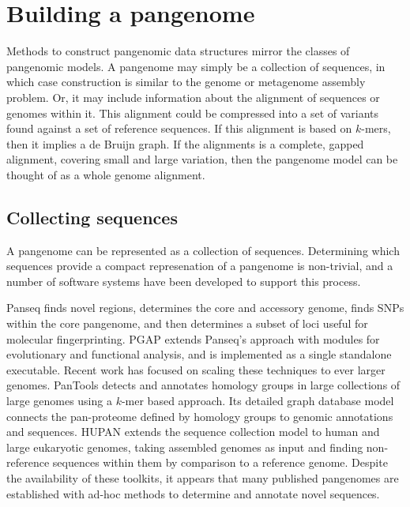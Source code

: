 \section{Building a pangenome}

Methods to construct pangenomic data structures mirror the classes of pangenomic models.
A pangenome may simply be a collection of sequences, in which case construction is similar to the genome or metagenome assembly problem.
Or, it may include information about the alignment of sequences or genomes within it.
This alignment could be compressed into a set of variants found against a set of reference sequences.
If this alignment is based on $k$-mers, then it implies a de Bruijn graph.
If the alignments is a complete, gapped alignment, covering small and large variation, then the pangenome model can be thought of as a whole genome alignment.

\subsection{Collecting sequences}

A pangenome can be represented as a collection of sequences.
Determining which sequences provide a compact represenation of a pangenome is non-trivial, and a number of software systems have been developed to support this process.

Panseq \cite{Laing_2010} finds novel regions, determines the core and accessory genome, finds SNPs within the core pangenome, and then determines a subset of loci useful for molecular fingerprinting.
PGAP \cite{Zhao_2011} extends Panseq's approach with modules for evolutionary and functional analysis, and is implemented as a single standalone executable.
Recent work has focused on scaling these techniques to ever larger genomes.
PanTools \cite{Sheikhizadeh_Anari_2018} detects and annotates homology groups in large collections of large genomes using a $k$-mer based approach.
Its detailed graph database model connects the pan-proteome defined by homology groups to genomic annotations and sequences.
HUPAN \citep{Duan_2019} extends the sequence collection model to human and large eukaryotic genomes, taking assembled genomes as input and finding non-reference sequences within them by comparison to a reference genome.
Despite the availability of these toolkits, it appears that many published pangenomes are established with ad-hoc methods to determine and annotate novel sequences.

